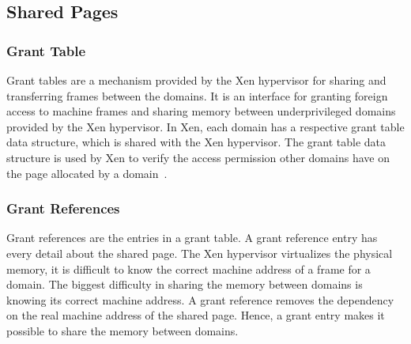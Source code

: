 \subsection*{Shared Pages}
\label{subsec:sharedpages}
\subsubsection*{Grant Table} 
Grant tables are a mechanism provided by the Xen hypervisor for sharing and transferring frames between the domains. It is an interface for granting foreign access to machine frames and sharing memory between underprivileged domains provided by the Xen hypervisor. In Xen, each domain has a respective grant table data structure, which is shared with the Xen hypervisor. The grant table data structure is used by Xen to verify the access permission other domains have on the page allocated by a domain~\cite{granttable}.

\subsubsection*{Grant References}
Grant references are the entries in a grant table. A grant reference entry has every detail about the shared page. The Xen hypervisor virtualizes the physical memory, it is difficult to know the correct machine address of a frame for a domain. The biggest difficulty in sharing the memory between domains is knowing its correct machine address. A grant reference removes the dependency on the real machine address of the shared page. Hence, a grant entry makes it possible to share the memory between domains.\cite{Chisnall:2007:DGX:1407351, Barham:2003:XAV:945445.945462, granttable} 

